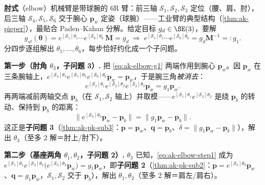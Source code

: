 \begin{example}\label{exam:ak-elbow-ik}
\textbf{肘式}（elbow）机械臂是带球腕的 6R 臂：前三轴 $\mathcal{S}_1,\mathcal{S}_2,\mathcal{S}_3$ 定位（腰、肩、肘），后三轴 $\mathcal{S}_4,\mathcal{S}_5,\mathcal{S}_6$ 交于腕心 $\mathbf{p}_w$ 定姿（球腕）——工业臂的典型结构（\cref{thm:ak-pieper}），最贴合 Paden--Kahan 分解\cite{murray1994mathematical}。给定目标 $g_d\in\SE(3)$，要解
\begin{equation}
g_{st}(\boldsymbol{\theta})=e^{[\mathcal{S}_1]\theta_1}\cdots e^{[\mathcal{S}_6]\theta_6}\,\mathbf{M}=g_d
\;\Longrightarrow\;
e^{[\mathcal{S}_1]\theta_1}\cdots e^{[\mathcal{S}_6]\theta_6}=g_d\mathbf{M}^{-1}=:g_1.
\label{eq:ak-elbow-g1}
\end{equation}
分四步逐组解出 $\theta_1,\dots,\theta_6$，每步恰好约化成一个子问题。

\textbf{第一步（肘角 $\theta_3$，子问题 3）.} 把 \cref{eq:ak-elbow-g1} 两端作用到腕心 $\mathbf{p}_w$。因 $\mathbf{p}_w$ 在三条腕轴上，$e^{[\mathcal{S}_4]\theta_4}e^{[\mathcal{S}_5]\theta_5}e^{[\mathcal{S}_6]\theta_6}\mathbf{p}_w=\mathbf{p}_w$，于是腕三角\emph{被消去}：
\begin{equation}
e^{[\mathcal{S}_1]\theta_1}e^{[\mathcal{S}_2]\theta_2}e^{[\mathcal{S}_3]\theta_3}\mathbf{p}_w=g_1\mathbf{p}_w.
\label{eq:ak-elbow-step1}
\end{equation}
再两端减前两轴交点 $\mathbf{p}_b$（在 $\mathcal{S}_1,\mathcal{S}_2$ 轴上）并取模——$e^{[\mathcal{S}_1]\theta_1}e^{[\mathcal{S}_2]\theta_2}$ 是绕 $\mathbf{p}_b$ 的转动、保持到 $\mathbf{p}_b$ 的距离：
\begin{equation}
\big\|e^{[\mathcal{S}_3]\theta_3}\mathbf{p}_w-\mathbf{p}_b\big\|=\big\|g_1\mathbf{p}_w-\mathbf{p}_b\big\|.
\label{eq:ak-elbow-norm}
\end{equation}
这正是\textbf{子问题 3}（\cref{thm:ak-pk-sub3}：$\mathbf{p}=\mathbf{p}_w$、$\mathbf{q}=\mathbf{p}_b$、$\delta=\|g_1\mathbf{p}_w-\mathbf{p}_b\|$），解出 $\theta_3$（至多 2 解＝肘上/肘下）。

\textbf{第二步（基座两角 $\theta_1,\theta_2$，子问题 2）.} $\theta_3$ 已知，\cref{eq:ak-elbow-step1} 成为 $e^{[\mathcal{S}_1]\theta_1}e^{[\mathcal{S}_2]\theta_2}\big(e^{[\mathcal{S}_3]\theta_3}\mathbf{p}_w\big)=g_1\mathbf{p}_w$，即\textbf{子问题 2}（\cref{thm:ak-pk-sub2}：$\mathbf{p}=e^{[\mathcal{S}_3]\theta_3}\mathbf{p}_w$、$\mathbf{q}=g_1\mathbf{p}_w$，$\mathcal{S}_1,\mathcal{S}_2$ 交于 $\mathbf{p}_b$），解出 $\theta_1,\theta_2$（至多 2 解＝肩左/肩右）。


\end{example}
